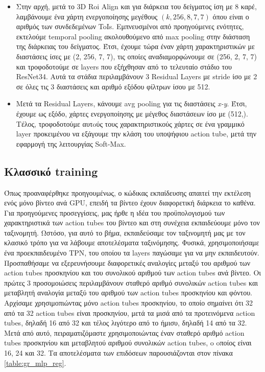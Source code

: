 \begin{itemize}
\item Στην αρχή, μετά το \en 3D Roi Align \gr και για  διάρκεια του δείγματος ίση με  8 καρέ,
λαμβάνουμε ένα χάρτη ενεργοποίησης μεγέθους  $(k, 256, 8, 7, 7)$ όπου  είναι ο αριθμός των συνδεδεμένων ToIs. Εμπνευσμένοι
από προηγούμενες ενότητες, εκτελούμε \en temporal pooling \gr ακολουθούμενο  από
\en max pooling \gr  στην  διάσταση της διάρκειας του δείγματος. Έτσι, έχουμε τώρα έναν χάρτη χαρακτηριστικών 
με διαστάσεις ίσες με (2, 256, 7, 7), τις οποίες αναδιαμορφώνουμε σε
(256, 2, 7, 7) και τροφοδοτούμε σε \en layers \gr που εξήχθησαν από το τελευταίο στάδιο του \en ResNet34\gr.
Αυτά τα στάδια περιλαμβάνουν 3 \en Residual Layers \gr  με \en stride \gr  ίσο με 2 σε όλες τις 3
διαστάσεις και αριθμό εξόδου φίλτρων ίσου με 512.
\item Μετά τα \en Residual Layers\gr, κάνουμε \en avg pooling \gr για τις διαστάσεις \en \textit{ x-y}\gr.
Έτσι, έχουμε ως  εξόδο, χάρτες ενεργοποίησης με μέγεθος διαστάσεων ίσο με (512,).
Τέλος, τροφοδοτούμε  αυτoύς  τους  χαρακτηριστικούς  χάρτες σε ένα γραμμικό \en layer \gr προκειμένου να εξάγουμε την κλάση
του υποψήφιου \en action tube, \gr μετά την εφαρμογή της λειτουργίας \en  Soft-Max\gr.
\end{itemize}

\subsection{Κλασσικό \en training}
Όπως προαναφέρθηκε προηγουμένως, ο κώδικας εκπαίδευσης απαιτεί την εκτέλεση ενός μόνο βίντεο ανά \en GPU\gr, επειδή τα βίντεο έχουν διαφορετική διάρκεια το καθένα.
Για προηγούμενες προσεγγίσεις, μας ήρθε η  ιδέα του προϋπολογισμού των χαρακτηριστικά των \en action tubes \gr του βίντεο και στη συνέχεια
εκπαιδεύουμε μόνο τον ταξινομητή. Ωστόσο, για αυτό το βήμα, εκπαιδεύσαμε τον ταξινομητή μας με τον κλασικό τρόπο για να λάβουμε
αποτελέσματα ταξινόμησης. Φυσικά, χρησιμοποιήσαμε ένα προεκπαιδευμένο \en TPN\gr, του οποίου τα \en layers \gr παγώσαμε  για να μην εκπαιδευτούν.
Προσπαθήσαμε να εξερευνήσουμε διαφορετικές αναλογίες μεταξύ του αριθμού των \en action tubes \gr προσκηνίου και του συνολικού αριθμού των
\en action tubes \gr ανά βίντεο. Οι πρώτες 3 προσομοιώσεις περιλαμβάνουν σταθερό αριθμό συνολικών \en action tubes \gr και μεταβλητή αναλογία
μεταξύ του αριθμού των \en action tubes \gr προσκηνίου και φόντου. Αρχίσαμε χρησιμοπιώντας μόνο \en action tubes \gr προσκηνίου, το  οποίο
σημαίνει ότι 32 από τα 32  \en action tubes  \gr είναι προσκηνίου, μετά τα μισά από τα προτεινόμενα  \en action tubes, \gr δηλαδή 16 από 32 και
τέλος λιγότερο από το ήμισυ, δηλαδή 14 από τα 32.
Μετά από αυτό, πειραματιζόμαστε χρησιμοποιώντας έναν σταθερό αριθμό \en action tubes \gr προσκηνίου και μεταβλητού αριθμού συνολικών \en action tubes, \gr o oποίος είναι 16, 24 και 32. Τα αποτελέσματα των επιδόσεων παρουσιάζονται στον πίνακα \ref{table:gr_mlp_reg}.


